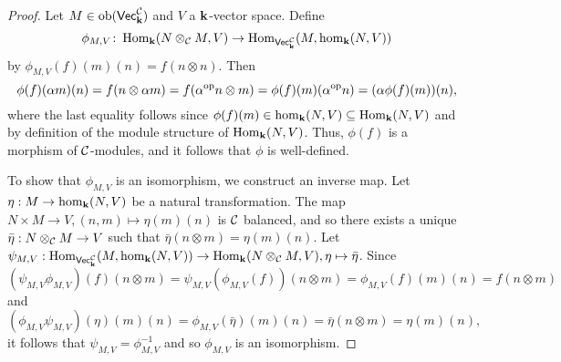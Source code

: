 \begin{proof}
    Let $M\in\operatorname{ob}(\normalfont\mathsf{Vec}_{\mathbf{k}}^{\mathcal{C}})$ and $V$ a $\mathbf{k}$-vector space.
    Define 
    \[\phi_{M,V}\colon\operatorname{Hom}_{\mathbf{k}}(N\otimes_{\mathcal{C}} M, V)\to\operatorname{Hom}_{\normalfont\mathsf{Vec}_{\mathbf{k}}^{\mathcal{C}}}(M,\hom_{\mathbf{k}}(N, V))\]
    by $\phi_{M,V}(f)(m)(n)=f(n\otimes n)$.
    Then
    \[ \phi(f)(\alpha m)(n)=f(n\otimes\alpha m)=f(\alpha^{\text{op}} n\otimes m)=\phi(f)(m)(\alpha^{\text{op}}n)=(\alpha\phi(f)(m))(n), \]
    where the last equality follows since $\phi(f)(m)\in\hom_{\mathbf{k}}(N,V)\subseteq\operatorname{Hom}_{\mathbf{k}}(N,V)$ and by definition of the module structure of $\operatorname{Hom}_{\mathbf{k}}(N, V)$.
    Thus, $\phi(f)$ is a morphism of $\mathcal{C}$-modules, and it follows that $\phi$ is well-defined.
    
    To show that $\phi_{M,V}$ is an isomorphism, we construct an inverse map.
    Let $\eta:M\to\hom_{\mathbf{k}}(N,V)$ be a natural transformation. 
    The map $N\times M\to V, (n,m)\mapsto \eta(m)(n)$ is $\mathcal{C}$ balanced, and so there exists a unique $\bar{\eta}:N\otimes_{\mathcal{C}} M\to V$ such that $\bar{\eta}(n\otimes m)=\eta(m)(n)$.
    Let $\psi_{M,V}:\operatorname{Hom}_{\normalfont\mathsf{Vec}_{\mathbf{k}}^{\mathcal{C}}}(M,\hom_{\mathbf{k}}(N,V))\to\operatorname{Hom}_{\mathbf{k}}(N\otimes_{\mathcal{C}} M, V), \eta\mapsto\bar{\eta}$.
    Since
    \[ (\psi_{M,V}\phi_{M,V})(f)(n\otimes m)=\psi_{M, V}(\phi_{M,V}(f))(n\otimes m)=\phi_{M,V}(f)(m)(n)=f(n\otimes m) \]
    and
    \[ (\phi_{M, V}\psi_{M,V})(\eta)(m)(n)=\phi_{M,V}(\bar{\eta})(m)(n)=\bar{\eta}(n\otimes m)=\eta(m)(n), \]
    it follows that $\psi_{M,V}=\phi_{M,V}^{-1}$ and so $\phi_{M,V}$ is an isomorphism.
    

\end{proof}
